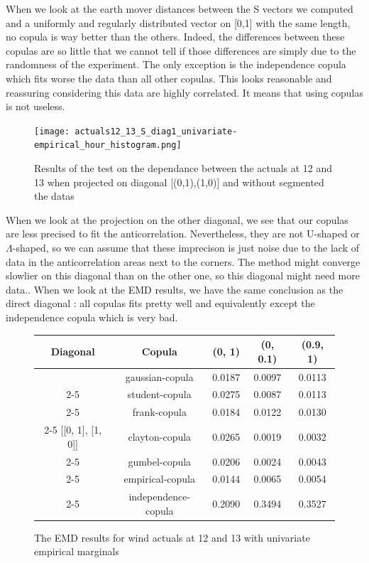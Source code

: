 \documentclass{article}
\begin{document}
When we look at the earth mover distances between the S vectors we computed and a uniformly and regularly distributed vector on [0,1] with the same length, no copula is way better than the others. Indeed, the differences between these copulas are so little that we cannot tell if those differences are simply due to the randomness of the experiment. The only exception is the independence copula which fits worse the data than all other copulas. This looks reasonable and reassuring considering this data are highly correlated. It means that using copulas is not useless.



\begin{figure}[H]
  
    \texttt{[image: actuals12\_13\_S\_diag1\_univariate-empirical\_hour\_histogram.png]}
    \centering
    \caption{Results of the test on the dependance between the actuals at 12 and 13 when projected on diagonal [(0,1),(1,0)] and without segmented the datas}
\end{figure}
When we look at the projection on the other diagonal, we see that our copulas are less precised to fit the anticorrelation. Nevertheless, they are not U-shaped or $\Lambda$-shaped, so we can assume that these imprecison is just noise due to the lack of data in the anticorrelation areas next to the corners. The method might converge slowlier on this diagonal than on the other one, so this diagonal might need more data.. When we look at the EMD results, we have the same conclusion as the direct diagonal : all copulas fits pretty well and equivalently except the independence copula which is very bad.

\begin{figure}[H]
\centering
\begin{tabular}{|c|c|c|c|c|}

\hline
Diagonal & Copula & (0, 1) & (0, 0.1) & (0.9, 1) \\ \hline
& gaussian-copula & 0.0187 & 0.0097 & 0.0113 \\ \cline{2-5}
& student-copula & 0.0275 & 0.0087 & 0.0113 \\ \cline{2-5}
 & frank-copula & 0.0184 & 0.0122 & 0.0130 \\ \cline{2-5}
[[0, 1], [1, 0]] & clayton-copula & 0.0265 & 0.0019 & 0.0032 \\ \cline{2-5}
& gumbel-copula & 0.0206 & 0.0024 & 0.0043 \\ \cline{2-5}
 & empirical-copula & 0.0144 & 0.0065 & 0.0054 \\ \cline{2-5}
 & independence-copula & 0.2090 & 0.3494 & 0.3527
\\ \hline
 
\end{tabular}
\caption{The EMD results for wind actuals at 12 and 13 with univariate empirical marginals}
\end{figure}
\end{document}
